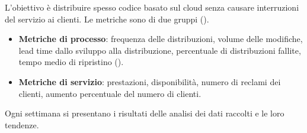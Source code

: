 \begin{esempio}
L'obiettivo è distribuire spesso codice basato sul cloud senza causare interruzioni del servizio ai clienti. Le
metriche sono di due gruppi ().
\begin{itemize}
  \item \textbf{Metriche di processo}: frequenza delle distribuzioni, volume delle modifiche, lead time dallo sviluppo
    alla distribuzione, percentuale di distribuzioni fallite, tempo medio di ripristino ().
  \item \textbf{Metriche di servizio}: prestazioni, disponibilità, numero di reclami dei clienti, aumento percentuale
    del numero di clienti.
\end{itemize}
Ogni settimana si presentano i risultati delle analisi dei dati raccolti e le loro tendenze.
\end{esempio}

